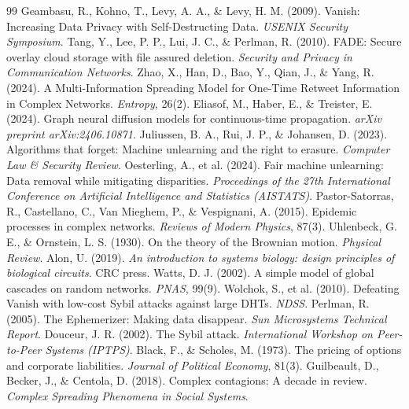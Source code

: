 \documentclass[review,12pt]{elsarticle}
\begin{document}
\vspace{1em}

\begin{thebibliography}{99}
Geambasu, R., Kohno, T., Levy, A. A., \& Levy, H. M. (2009). Vanish: Increasing Data Privacy with Self-Destructing Data. \emph{USENIX Security Symposium}.
Tang, Y., Lee, P. P., Lui, J. C., \& Perlman, R. (2010). FADE: Secure overlay cloud storage with file assured deletion. \emph{Security and Privacy in Communication Networks}.
Zhao, X., Han, D., Bao, Y., Qian, J., \& Yang, R. (2024). A Multi-Information Spreading Model for One-Time Retweet Information in Complex Networks. \emph{Entropy}, 26(2).
Eliasof, M., Haber, E., \& Treister, E. (2024). Graph neural diffusion models for continuous-time propagation. \emph{arXiv preprint arXiv:2406.10871}.
Juliussen, B. A., Rui, J. P., \& Johansen, D. (2023). Algorithms that forget: Machine unlearning and the right to erasure. \emph{Computer Law \& Security Review}.
Oesterling, A., et al. (2024). Fair machine unlearning: Data removal while mitigating disparities. \emph{Proceedings of the 27th International Conference on Artificial Intelligence and Statistics (AISTATS)}.
Pastor-Satorras, R., Castellano, C., Van Mieghem, P., \& Vespignani, A. (2015). Epidemic processes in complex networks. \emph{Reviews of Modern Physics}, 87(3).
Uhlenbeck, G. E., \& Ornstein, L. S. (1930). On the theory of the Brownian motion. \emph{Physical Review}.
Alon, U. (2019). \emph{An introduction to systems biology: design principles of biological circuits}. CRC press.
Watts, D. J. (2002). A simple model of global cascades on random networks. \emph{PNAS}, 99(9).
Wolchok, S., et al. (2010). Defeating Vanish with low-cost Sybil attacks against large DHTs. \emph{NDSS}.
Perlman, R. (2005). The Ephemerizer: Making data disappear. \emph{Sun Microsystems Technical Report}.
Douceur, J. R. (2002). The Sybil attack. \emph{International Workshop on Peer-to-Peer Systems (IPTPS)}.
Black, F., \& Scholes, M. (1973). The pricing of options and corporate liabilities. \emph{Journal of Political Economy}, 81(3).
Guilbeault, D., Becker, J., \& Centola, D. (2018). Complex contagions: A decade in review. \emph{Complex Spreading Phenomena in Social Systems}.

\end{thebibliography}
\end{document}
